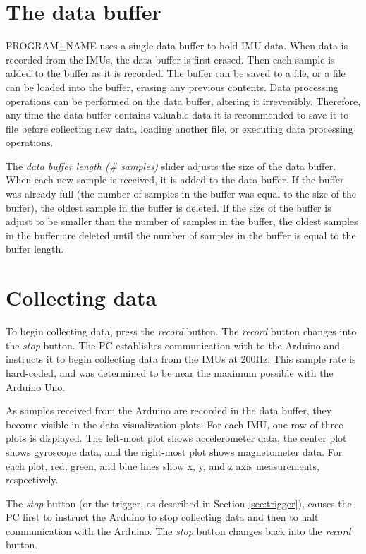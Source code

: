 \documentclass[11pt,letterpaper,article,oneside]{memoir}
\newcommand{\name}{PROGRAM\_NAME}
\begin{document}
\chapter{The data buffer}
\name{} uses a single data buffer to hold IMU data. When data is recorded from
the IMUs, the data buffer is first erased. Then each sample is added to the
buffer as it is recorded. The buffer can be saved to a file, or a file can be
loaded into the buffer, erasing any previous contents. Data processing
operations can be performed on the data buffer, altering it irreversibly.
Therefore, any time the data buffer contains valuable data it is recommended to
save it to file before collecting new data, loading another file, or executing
data processing operations.

The \emph{data buffer length (\# samples)} slider adjusts the size of the data
buffer. When each new sample is received, it is added to the data buffer. If the
buffer was already full (the number of samples in the buffer was equal to the
size of the buffer), the oldest sample in the buffer is deleted. If the size of
the buffer is adjust to be smaller than the number of samples in the buffer, the
oldest samples in the buffer are deleted until the number of samples in the
buffer is equal to the buffer length.


\chapter{Collecting data}

To begin collecting data, press the \emph{record} button.  The \emph{record} button
changes into the \emph{stop} button.  The PC establishes communication with to the
Arduino and instructs it to begin collecting data from the IMUs at 200Hz. This
sample rate is hard-coded, and was determined to be near the maximum possible
with the Arduino Uno.

As samples received from the Arduino are recorded in the data buffer, they
become visible in the data visualization plots. For each IMU, one row of three
plots is displayed. The left-most plot shows accelerometer data, the center plot
shows gyroscope data, and the right-most plot shows magnetometer data. For each
plot, red, green, and blue lines show x, y, and z axis measurements,
respectively.

The \emph{stop} button (or the trigger, as described in Section \ref{sec:trigger}),
causes the PC first to instruct the Arduino to stop collecting data and then to
halt communication with the Arduino. The \emph{stop} button changes back into the
\emph{record} button.
\end{document}
